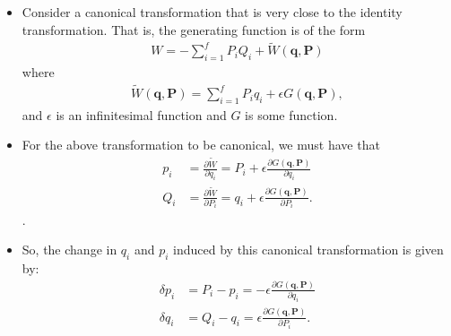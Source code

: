 \documentclass[10pt]{article}
\newcommand{\ve}[1]{\mathbf{#1}}
\begin{document}
  \begin{itemize}
    \item Consider a canonical transformation that is very close to the identity transformation. That is, the generating function is of the form     
    \begin{align*}
      W = -\sum_{i=1}^f P_i Q_i + \widetilde{W}(\ve{q}, \ve{P})
    \end{align*}
    where
    \begin{align*}
    \widetilde{W}(\ve{q}, \ve{P})
    = \sum_{i=1}^f P_i q_i + \epsilon G(\ve{q}, \ve{P}),
    \end{align*}
    and $\epsilon$ is an infinitesimal function and $G$ is some function.

    \item For the above transformation to be canonical, we must have that
    \begin{align*}
      p_i &= \frac{\partial \widetilde{W}}{\partial q_i} = P_i + \epsilon \frac{\partial G(\ve{q}, \ve{P})}{\partial q_i} \\
      Q_i &= \frac{\partial \widetilde{W}}{\partial P_i} = q_i + \epsilon \frac{\partial G(\ve{q}, \ve{P})}{\partial P_i}.
    \end{align*}.

    \item So, the change in $q_i$ and $p_i$ induced by this canonical transformation is given by:
    \begin{align*}
      \delta p_i &= P_i - p_i = -\epsilon \frac{\partial G(\ve{q},\ve{P})}{\partial q_i} \\
      \delta q_i &= Q_i - q_i = \epsilon \frac{\partial G(\ve{q},\ve{P})}{\partial P_i}.
    \end{align*}


\end{itemize}
\end{document}
